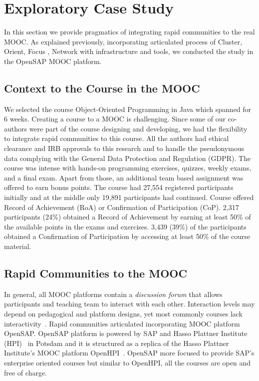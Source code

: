 \documentclass[manuscript,screen,review]{acmart}
\begin{document}
\section{Exploratory Case Study}
In this section we provide pragmatics of integrating rapid communities to the real MOOC. As explained previously, incorporating articulated process of Cluster, Orient, Focus , Network with infrastructure and tools, we conducted the study in the OpenSAP MOOC platform. 

\subsection{Context to the Course in the MOOC}
We selected the course Object-Oriented Programming in Java which spanned for 6 weeks. Creating a course to a MOOC is challenging. Since some of our co-authors were part of the course designing and developing, we had the flexibility to integrate rapid communities to this course. All the authors had ethical clearance and IRB approvals to this research and to handle the pseudonymous data complying with the General Data Protection and Regulation (GDPR). The course was intense with hands-on programming exercises, quizzes, weekly exams, and a final exam. Apart from those, an additional team based assignment was offered to earn bonus points. The course had 27,554 registered participants initially and at the middle only 19,891 participants had continued.  Course offered Record of Achievement (RoA) or Confirmation of Participation (CoP). 2,317 participants (24\%) obtained a Record of Achievement by earning at least 50\% of the available points in the exams and exercises. 3,439 (39\%) of the participants obtained a Confirmation of Participation by accessing at least 50\% of the course material. 


\subsection{Rapid Communities to the MOOC}
In general, all MOOC platforms contain a \textit{discussion forum} that  allows participants and teaching team to interact with each other. Interaction levels may depend on pedagogical and platform designs, yet most commonly courses lack interactivity~\cite{gamage2020moocs}. Rapid communities articulated incorporating MOOC platform OpenSAP. OpenSAP platform is powered by SAP and Hasso Plattner Institute (HPI)~\cite{OpenSAP} in Potsdam and it is structured as a replica of the Hasso Plattner Institute's MOOC platform OpenHPI~\cite{OpenHPI}. OpenSAP more focused to provide SAP's enterprise oriented  courses but similar to OpenHPI, all the courses are open and free of charge. 
\end{document}
